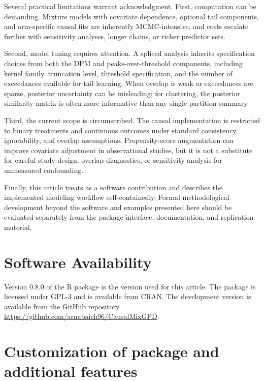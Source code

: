\documentclass[article]{jss}\usepackage[]{graphicx}\usepackage[]{xcolor}
\begin{document}
Several practical limitations warrant acknowledgment.  First,
computation can be demanding.  Mixture models with covariate
dependence, optional tail components, and arm-specific causal fits are
inherently MCMC-intensive, and costs escalate further with sensitivity
analyses, longer chains, or richer predictor sets.

Second, model tuning requires attention.  A spliced analysis inherits
specification choices from both the DPM and peaks-over-threshold
components, including kernel family, truncation level, threshold
specification, and the number of exceedances available for tail
learning.  When overlap is weak or exceedances are sparse, posterior
uncertainty can be misleading; for clustering, the posterior
similarity matrix is often more informative than any single partition
summary.

Third, the current scope is circumscribed.  The causal implementation
is restricted to binary treatments and continuous outcomes under
standard consistency, ignorability, and overlap assumptions.
Propensity-score augmentation can improve covariate adjustment in
observational studies, but it is not a substitute for careful study
design, overlap diagnostics, or sensitivity analysis for unmeasured
confounding.

Finally, this article treats  as a software
contribution and describes the implemented modeling workflow
self-containedly.  Formal methodological development beyond the
software and examples presented here should be evaluated separately
from the package interface, documentation, and replication material.

\section{Software Availability}
\label{sec:software}

Version 0.8.0 of the  R package is the version used
for this article. The package is licensed under GPL-3 and is available
from CRAN.
The development version is available from the GitHub repository
\url{https://github.com/arnabaich96/CausalMixGPD}.




\clearpage
\appendix
\section{Customization of package and additional features}
\label{sec:appendix-features}
\end{document}
